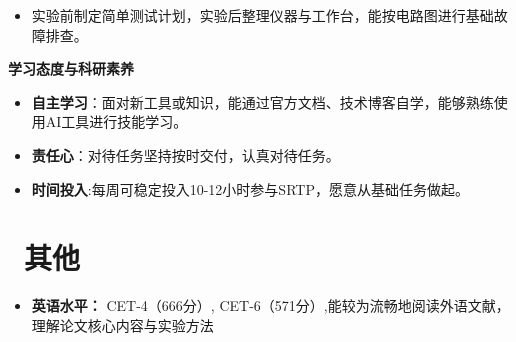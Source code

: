 \documentclass[11pt]{article}
\newlength{\interProjectSpacing}
\newcommand{\projectsep}{\vspace{\interProjectSpacing}}
\newlength{\intraProjectTitleSep}
\newcommand{\titlebreak}{\\[\intraProjectTitleSep]}
\newlength{\intraProjectListTopSep}
\begin{document}
\begin{itemize}[nosep, topsep=\intraProjectListTopSep]
   \item 实验前制定简单测试计划，实验后整理仪器与工作台，能按电路图进行基础故障排查。

\end{itemize}
\projectsep
\textbf{学习态度与科研素养}  \titlebreak
\begin{itemize}[nosep, topsep=\intraProjectListTopSep]
    \item \textbf{自主学习}：面对新工具或知识，能通过官方文档、技术博客自学，能够熟练使用AI工具进行技能学习。
    \item \textbf{责任心}：对待任务坚持按时交付，认真对待任务。
    \item \textbf{时间投入}:每周可稳定投入10-12小时参与SRTP，愿意从基础任务做起。

    
\end{itemize}

    
\section{\makebox[\widthof{\faInfo}][c]{\color{CVBlue}\faInfo}\ 其他}
\begin{itemize}[parsep=0.5ex]
    \item \textbf{英语水平：} CET-4（666分）, CET-6（571分）,能较为流畅地阅读外语文献，理解论文核心内容与实验方法
\end{itemize}
\end{document}
